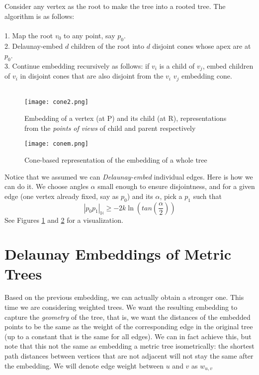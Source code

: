 Consider any vertex as the root to make the tree into a rooted tree. The algorithm is as follows: \\
\horrule{0.5pt} \\
1. Map the root $v_0$ to any point, say $p_0$. \\
2. Delaunay-embed $d$ children of the root into $d$ disjoint cones whose apex are at $p_0$. \\
3. Continue embedding recursively as follows: if $v_i$ is a child of $v_j$, embed children of $v_i$ in disjoint cones that are also disjoint from the $v_i$ $v_j$ embedding cone.  \\
\horrule{0.5pt} \\

\begin{figure}
    \centering
    \texttt{[image: cone2.png]}
    \caption{Embedding of a vertex (at P) and its child (at R), representations from the \textit{points of views} of child and parent respectively}
    \label{fig:cone_two}
\end{figure}

\begin{figure}
    \centering
    \texttt{[image: conem.png]}
    \caption{Cone-based representation of the embedding of a whole tree}
    \label{fig:cone_multiple}
\end{figure}

Notice that we assumed we can \textit{Delaunay-embed} individual edges. Here is how we can do it. We choose angles $\alpha$ small enough to ensure disjointness, and for a given edge (one vertex already fixed, say as $p_0$) and its $\alpha$, pick a $p_1$ such that $$|p_0p_1|_{\mathbb{H}} \geq -2k\ln(tan(\frac{\alpha}{2}))$$ See Figures \ref{fig:cone_two} and \ref{fig:cone_multiple} for a visualization.

\section{Delaunay Embeddings of Metric Trees}
Based on the previous embedding, we can actually obtain a stronger one. This time we are considering weighted trees. We want the resulting embedding to capture the \textit{geometry} of the tree, that is, we want the distances of the embedded points to be the same as the weight of the corresponding edge in the original tree (up to a constant that is the same for all edges). We can in fact achieve this, but note that this not the same as embedding a metric tree isometrically: the shortest path distances between vertices that are not adjacent will not stay the same after the embedding. We will denote edge weight between $u$ and $v$ as $w_{u,v}$

